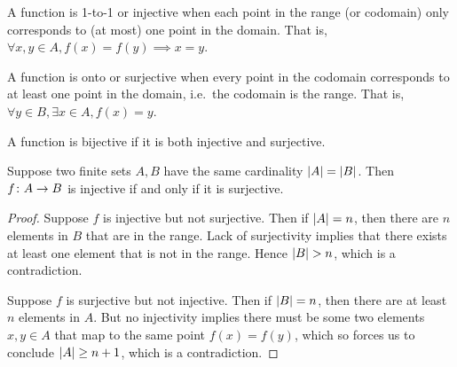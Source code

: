 \begin{definition}
    A function is 1-to-1 or injective
    when each point in the range (or codomain)
    only corresponds to (at most) one point in the domain.
    That is, \(\forall x,y \in A, f(x) = f(y) \implies x = y\).
\end{definition}
\begin{definition}
    A function is onto or surjective
    when every point in the codomain
    corresponds to at least one point in the domain,
    i.e.\ the codomain is the range.
    That is, \(\forall y \in B, \exists x \in A, f(x) = y\).
\end{definition}
\begin{definition}
    A function is bijective if it is both injective and surjective.
\end{definition}


\begin{theorem}
    Suppose two finite sets \(A,B\) have the same cardinality
    \(\abs{A} = \abs{B}\).
    Then \(f\colon A\to B\) is injective
    if and only if it is surjective.
\end{theorem}
\begin{proof}
    Suppose \(f\) is injective but not surjective.
    Then if \(\abs{A} = n\),
    then there are \(n\) elements in \(B\) that are in the range.
    Lack of surjectivity implies that
    there exists at least one element that is not in the range.
    Hence \(\abs{B} > n\), which is a contradiction.

    Suppose \(f\) is surjective but not injective.
    Then if \(\abs{B} = n\),
    then there are at least \(n\) elements in \(A\).
    But no injectivity implies there must be some two elements
    \(x,y \in A\) that map to the same point \(f(x) = f(y)\),
    which so forces us to conclude \(\abs{A} \geq n+1\),
    which is a contradiction.
\end{proof}

